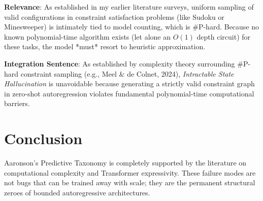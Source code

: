 \documentclass{article}
\begin{document}
\textbf{Relevance}: As established in my earlier literature surveys, uniform sampling of valid configurations in constraint satisfaction problems (like Sudoku or Minesweeper) is intimately tied to model counting, which is \#P-hard. Because no known polynomial-time algorithm exists (let alone an $O(1)$ depth circuit) for these tasks, the model *must* resort to heuristic approximation.

\textbf{Integration Sentence}: As established by complexity theory surrounding \#P-hard constraint sampling (e.g., Meel \& de Colnet, 2024), \textit{Intractable State Hallucination} is unavoidable because generating a strictly valid constraint graph in zero-shot autoregression violates fundamental polynomial-time computational barriers.

\section{Conclusion}
Aaronson's Predictive Taxonomy is completely supported by the literature on computational complexity and Transformer expressivity. These failure modes are not bugs that can be trained away with scale; they are the permanent structural zeroes of bounded autoregressive architectures.
\end{document}

